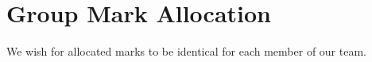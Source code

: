 \documentclass[a4paper, notoc]{tufte-handout}
\begin{document}
\section*{Group Mark Allocation}\label{group-mark-allocation}


We wish for allocated marks to be identical for each member of our team.
\end{document}
